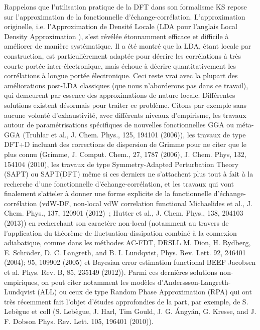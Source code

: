\documentclass[12pt,a4paper]{book}
\begin{document}
	Rappelons que l’utilisation pratique de la DFT dans son formalisme KS repose sur l’approximation de la fonctionnelle d’échange-corrélation. L’approximation originelle, i.e. l’Approximation de Densité Locale (LDA pour l’anglais \og Local Density Approximation \fg), s’est révélée étonnamment efficace et difficile à améliorer de manière systématique. Il a été montré que la LDA, étant locale par construction, est particulièrement adaptée pour décrire les corrélations à très courte portée inter-électronique, mais échoue à décrire quantitativement les corrélations à longue portée électronique. Ceci reste vrai avec la plupart des améliorations post-LDA classiques (que nous n’aborderons pas dans ce travail), qui demeurent par essence des approximations de nature locale. Différentes solutions existent désormais pour traiter ce problème. Citons par exemple sans aucune volonté d’exhaustivité, avec différents niveaux d’empirisme, les travaux autour de paramétrisations spécifiques de nouvelles fonctionnelles GGA ou méta-GGA (Truhlar et al., J. Chem. Phys., 125, 194101 (2006)), les travaux de type DFT+D incluant des corrections de dispersion de Grimme pour ne citer que le plus connu (Grimme, J. Comput. Chem., 27, 1787 (2006), J. Chem. Phys, 132, 154104 (2010), les travaux de type Symmetry-Adapted Perturbation Theory (SAPT) ou SAPT(DFT) même si ces derniers ne s’attachent plus tout à fait à la recherche d’une fonctionnelle d’échange-corrélation, et les travaux qui vont finalement s’atteler à donner une forme explicite de la fonctionnelle d’échange-corrélation (vdW-DF, non-local vdW correlation functional Michaelides et al., J. Chem. Phys., 137, 120901 (2012) ; Hutter et al., J. Chem. Phys., 138, 204103 (2013)) en recherchant son caractère non-local (notamment au travers de l’application du théorème de fluctuation-dissipation combiné à la connexion adiabatique, comme dans les méthodes AC-FDT, DRSLL M. Dion, H. Rydberg, E. Schröder, D. C. Langreth, and B. I. Lundqvist, Phys. Rev. Lett. 92, 246401 (2004); 95, 109902 (2005) et Bayesian error estimation functional BEEF Jacobsen et al. Phys. Rev. B, 85, 235149 (2012)). Parmi ces dernières solutions non-empiriques, on peut citer notamment les modèles d’Anderssson-Langreth-Lundqvist (ALL) ou ceux de type Random Phase Approximation (RPA) qui ont très récemment fait l’objet d’études approfondies de la part, par exemple, de S. Lebègue et coll (S. Lebègue, J. Harl, Tim Gould, J. G. Ángyán, G. Kresse, and J. F. Dobson Phys. Rev. Lett. 105, 196401 (2010)).\\
	
\end{document}
